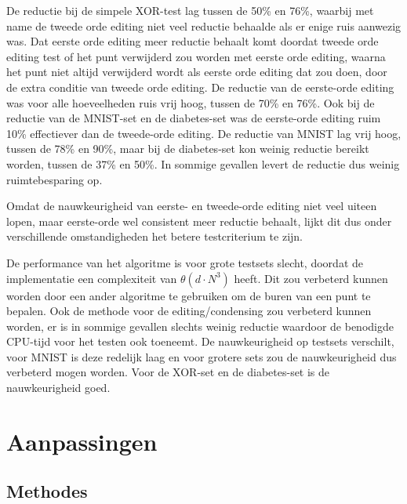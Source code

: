 \documentclass{article}
\begin{document}
De reductie bij de simpele XOR-test lag tussen de 50\% en 76\%, waarbij met name de tweede orde editing niet veel reductie behaalde als er enige ruis aanwezig was. Dat eerste orde editing meer reductie behaalt komt doordat tweede orde editing test of het punt verwijderd zou worden met eerste orde editing, waarna het punt niet altijd verwijderd wordt als eerste orde editing dat zou doen, door de extra conditie van tweede orde editing. De reductie van de eerste-orde editing was voor alle hoeveelheden ruis vrij hoog, tussen de 70\% en 76\%. Ook bij de reductie van de MNIST-set en de diabetes-set was de eerste-orde editing ruim 10\% effectiever dan de tweede-orde editing. De reductie van MNIST lag vrij hoog, tussen de 78\% en 90\%, maar bij de diabetes-set kon weinig reductie bereikt worden, tussen de 37\% en 50\%. In sommige gevallen levert de reductie dus weinig ruimtebesparing op.

Omdat de nauwkeurigheid van eerste- en tweede-orde editing niet veel uiteen lopen, maar eerste-orde wel consistent meer reductie behaalt, lijkt dit dus onder verschillende omstandigheden het betere testcriterium te zijn.

De performance van het algoritme is voor grote testsets slecht, doordat de implementatie een complexiteit van $\theta (d\cdot N^3)$ heeft. Dit zou verbeterd kunnen worden door een ander algoritme te gebruiken om de buren van een punt te bepalen. Ook de methode voor de editing/condensing zou verbeterd kunnen worden, er is in sommige gevallen slechts weinig reductie waardoor de benodigde CPU-tijd voor het testen ook toeneemt. De nauwkeurigheid op testsets verschilt, voor MNIST is deze redelijk laag en voor grotere sets zou de nauwkeurigheid dus verbeterd mogen worden. Voor de XOR-set en de diabetes-set is de nauwkeurigheid goed.

\section{Aanpassingen} %

\subsection{Methodes}
\end{document}
